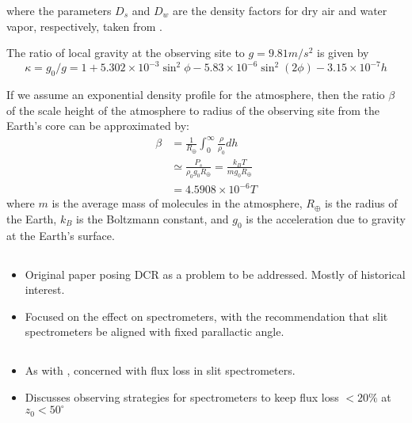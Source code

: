 \documentclass[DM,authoryear,toc]{lsstdoc}
\begin{document}
where the parameters $D_s$ and $D_w$ are the density factors for dry air and water vapor, respectively, taken from \cite{Owens:67}.

The ratio of local gravity at the observing site to $g = 9.81 m/s^2$ is given by
\begin{equation}
\kappa = g_0/g = 1 + 5.302\times 10^{-3} \sin^2\phi - 5.83\times 10^{-6} \sin^2(2\phi) - 3.15\times 10^{-7} h \label{eqn:kappa}
\end{equation}

If we assume an exponential density profile for the atmosphere, then the ratio $\beta$ of the scale height of the atmosphere to radius of the observing site from the Earth's core can be approximated by:
\begin{align}
	\beta &= \frac{1}{R_\oplus}\int_{0}^\infty \frac{\rho}{\rho_0} dh \nonumber \\
	&\simeq \frac{P_s}{\rho_0g_0 R_\oplus} = \frac{k_BT}{m g_0 R_\oplus} \nonumber \\
	&=  4.5908\times 10^{-6} T \label{eqn:beta}
\end{align}
where $m$ is the average mass of molecules in the atmosphere, $R_\oplus$ is the radius of the Earth, $k_B$ is the Boltzmann constant, and $g_0$ is the acceleration due to gravity at the Earth's surface.



\subsection{\cite{Filippenko1982}}
\begin{itemize}
	\item Original paper posing DCR as a problem to be addressed. Mostly of historical interest.
	\item Focused on the effect on spectrometers, with the
	recommendation that slit spectrometers be aligned with fixed
	parallactic angle. 
\end{itemize}

\subsection{\cite{Cuby1998}}
\begin{itemize}
	\item As with \citeauthor{Filippenko1982}, concerned with flux loss in slit spectrometers. 
	\item Discusses observing strategies for spectrometers to keep flux loss $< 20\%$ at $z_0<50^\circ$
\end{itemize}

\subsection{\cite{Tomaney1996}}
\subsection{\cite{Mangum2015}}
\subsection{\cite{Auer2000}}


\end{document}

